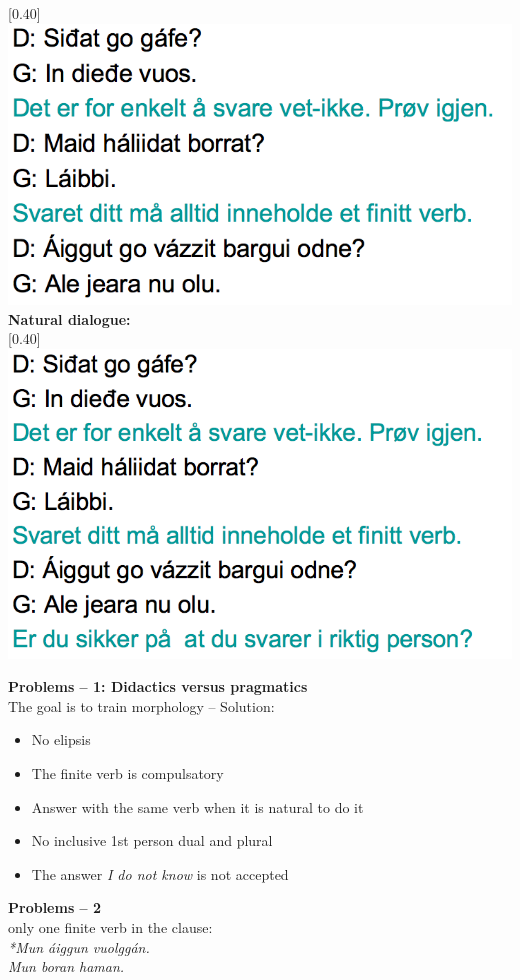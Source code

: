 \documentclass[landscape,norsk,11pt]{seminar}
\begin{document}
\begin{slide}
\scalebox{0.40}[0.40]{\includegraphics{img/lgiella5.png}} 
\newslide
\textbf{Natural dialogue:} \\

\scalebox{0.40}[0.40]{\includegraphics{img/lgiella6.png}} 


\newslide
\textbf{Problems -- 1: Didactics versus pragmatics} \\
The goal is to train morphology -- Solution:
\begin{itemize}
\item{No elipsis}
\item{The finite verb is compulsatory}
\item{Answer with the same verb when it is natural to do it}
\item{No inclusive 1st person dual and plural}
\item{The answer \textit{I do not know} is not accepted}
\end{itemize}




\newslide
\textbf{Problems -- 2} \\
only one finite verb in the clause: \\
\textit{*Mun áiggun vuolggán.}\\
\textit{Mun boran haman.}\\


\end{slide}
\end{document}
